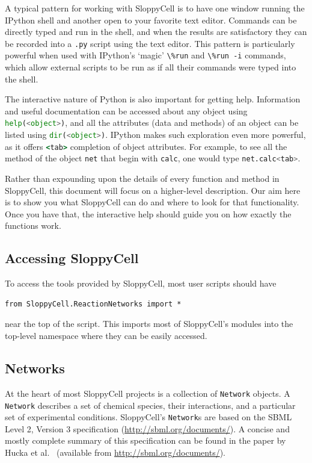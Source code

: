 \documentclass[12pt]{article}
\makeatletter
\newcommand{\py}[1]{\lstinline[language=Python, showstringspaces=False]@#1@}
\newcommand{\shell}[1]{\lstinline[language=csh, showstringspaces=False]!#1!}
\makeatother
\begin{document}
A typical pattern for working with SloppyCell is to have one window running the IPython shell and another open to your favorite text editor.
Commands can be directly typed and run in the shell, and when the results are satisfactory they can be recorded into a \shell{.py} script using the text editor.
This pattern is particularly powerful when used with IPython's `magic' \shell{\%run} and \shell{\%run -i} commands, which allow external scripts to be run as if all their commands were typed into the shell.

The interactive nature of Python is also important for getting help.
Information and useful documentation can be accessed about any object using \py{help(<object>)}, and all the attributes (data and methods) of an object can be listed using \py{dir(<object>)}.
IPython makes such exploration even more powerful, as it offers \shell{<tab>} completion of object attributes.
For example, to see all the method of the object \py{net} that begin with \py{calc}, one would type \py{net.calc<tab>}.  

Rather than expounding upon the details of every function and method in SloppyCell, this document will focus on a higher-level description.
Our aim here is to show you what SloppyCell can do and where to look for that functionality.
Once you have that, the interactive help should guide you on how exactly the functions work.

\subsection{Accessing SloppyCell}
To access the tools provided by SloppyCell, most user scripts should have
\begin{lstlisting}
from SloppyCell.ReactionNetworks import *
\end{lstlisting}
near the top of the script.
This imports most of SloppyCell's modules into the top-level namespace where they can be easily accessed.

\subsection{Networks}
At the heart of most SloppyCell projects is a collection of \py{Network} objects.
A \py{Network} describes a set of chemical species, their interactions, and a particular set of experimental conditions.
SloppyCell's \py{Network}s are based on the SBML Level 2, Version 3 specification (\url{http://sbml.org/documents/}).
A concise and mostly complete summary of this specification can be found in the paper by Hucka et al.~\cite{bib:Hucka2003} (available from \url{http://sbml.org/documents/}).
\end{document}
